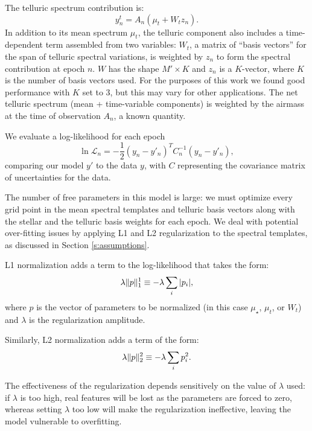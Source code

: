 \documentclass[modern]{aastex62}
\begin{document}
The telluric spectrum contribution is:
\begin{equation}
y_{n}^t =  A_n(\mu_{t} + W_{t} z_n).
\end{equation}
In addition to its mean spectrum $\mu_t$, the telluric component also includes a time-dependent term assembled from two variables: $W_t$, a matrix of ``basis vectors'' for the span of telluric spectral variations, is weighted by $z_n$ to form the spectral contribution at epoch $n$. 
$W$ has the shape $M' \times K$ and $z_n$ is a $K$-vector, where $K$ is the number of basis vectors used. 
For the purposes of this work we found good performance with $K$ set to 3, but this may vary for other applications. 
The net telluric spectrum (mean + time-variable components) is weighted by the airmass at the time of observation $A_n$, a known quantity.

We evaluate a log-likelihood for each epoch
\begin{equation}
\ln \mathcal{L}_n = -\frac{1}{2} (y_{n} - y'_{n})^T C_{n}^{-1} (y_{n}-y'_{n}),
\label{eqn:lnlike}
\end{equation}
comparing our model $y'$ to the data $y$, with $C$ representing the covariance matrix of uncertainties for the data. 

The number of free parameters in this model is large: we must optimize every grid point in the mean spectral templates and telluric basis vectors along with the stellar \RV and the telluric basis weights for each epoch. 
We deal with potential over-fitting issues by applying L1 and L2 regularization to the spectral templates, as discussed in Section \ref{s:assumptions}. 

L1 normalization adds a term to the log-likelihood that takes the form:
\begin{equation}
\Lone{\lambda}{p} \equiv -\lambda \sum_{i} | p_{i} | ,
\end{equation}
where $p$ is the vector of parameters to be normalized (in this case $\mu_{{\star}}$, $\mu_{{t}}$, or $W_{t}$) and $\lambda$ is the regularization amplitude.

Similarly, L2 normalization adds a term of the form:
\begin{equation}
\Ltwo{\lambda}{p} \equiv -\lambda \sum_{i} p_{i}^2 .
\end{equation}

The effectiveness of the regularization depends sensitively on the value of $\lambda$ used: if $\lambda$ is too high, real features will be lost as the parameters are forced to zero, whereas setting $\lambda$ too low will make the regularization ineffective, leaving the model vulnerable to overfitting. 
\end{document}
